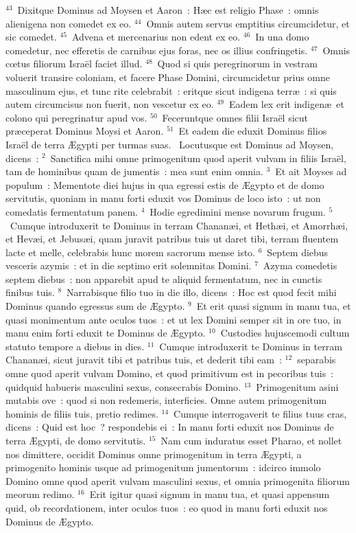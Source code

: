 ${}^{43}$~Dixitque Dominus ad Moysen et Aaron~: H\ae c est religio Phase~: omnis alienigena non comedet ex eo.
${}^{44}$~Omnis autem servus emptitius circumcidetur, et sic comedet.
${}^{45}$~Advena et mercenarius non edent ex eo.
${}^{46}$~In una domo comedetur, nec efferetis de carnibus ejus foras, nec os illius confringetis.
${}^{47}$~Omnis cœtus filiorum Isra\"el faciet illud.
${}^{48}$~Quod si quis peregrinorum in vestram voluerit transire coloniam, et facere Phase Domini, circumcidetur prius omne masculinum ejus, et tunc rite celebrabit~: eritque sicut indigena terr\ae~: si quis autem circumcisus non fuerit, non vescetur ex eo.
${}^{49}$~Eadem lex erit indigen\ae\ et colono qui peregrinatur apud vos.
${}^{50}$~Feceruntque omnes filii Isra\"el sicut pr\ae ceperat Dominus Moysi et Aaron.
${}^{51}$~Et eadem die eduxit Dominus filios Isra\"el de terra \AE gypti per turmas suas.
~Locutusque est Dominus ad Moysen, dicens~:
${}^{2}$~Sanctifica mihi omne primogenitum quod aperit vulvam in filiis Isra\"el, tam de hominibus quam de jumentis~: mea sunt enim omnia.
${}^{3}$~Et ait Moyses ad populum~: Mementote diei hujus in qua egressi estis de \AE gypto et de domo servitutis, quoniam in manu forti eduxit vos Dominus de loco isto~: ut non comedatis fermentatum panem.
${}^{4}$~Hodie egredimini mense novarum frugum.
${}^{5}$~Cumque introduxerit te Dominus in terram Chanan\ae i, et Heth\ae i, et Amorrh\ae i, et Hev\ae i, et Jebus\ae i, quam juravit patribus tuis ut daret tibi, terram fluentem lacte et melle, celebrabis hunc morem sacrorum mense isto.
${}^{6}$~Septem diebus vesceris azymis~: et in die septimo erit solemnitas Domini.
${}^{7}$~Azyma comedetis septem diebus~: non apparebit apud te aliquid fermentatum, nec in cunctis finibus tuis.
${}^{8}$~Narrabisque filio tuo in die illo, dicens~: Hoc est quod fecit mihi Dominus quando egressus sum de \AE gypto.
${}^{9}$~Et erit quasi signum in manu tua, et quasi monimentum ante oculos tuos~: et ut lex Domini semper sit in ore tuo, in manu enim forti eduxit te Dominus de \AE gypto.
${}^{10}$~Custodies hujuscemodi cultum statuto tempore a diebus in dies.
${}^{11}$~Cumque introduxerit te Dominus in terram Chanan\ae i, sicut juravit tibi et patribus tuis, et dederit tibi eam~:
${}^{12}$~separabis omne quod aperit vulvam Domino, et quod primitivum est in pecoribus tuis~: quidquid habueris masculini sexus, consecrabis Domino.
${}^{13}$~Primogenitum asini mutabis ove~: quod si non redemeris, interficies. Omne autem primogenitum hominis de filiis tuis, pretio redimes.
${}^{14}$~Cumque interrogaverit te filius tuus cras, dicens~: Quid est hoc~? respondebis ei~: In manu forti eduxit nos Dominus de terra \AE gypti, de domo servitutis.
${}^{15}$~Nam cum induratus esset Pharao, et nollet nos dimittere, occidit Dominus omne primogenitum in terra \AE gypti, a primogenito hominis usque ad primogenitum jumentorum~: idcirco immolo Domino omne quod aperit vulvam masculini sexus, et omnia primogenita filiorum meorum redimo.
${}^{16}$~Erit igitur quasi signum in manu tua, et quasi appensum quid, ob recordationem, inter oculos tuos~: eo quod in manu forti eduxit nos Dominus de \AE gypto.


